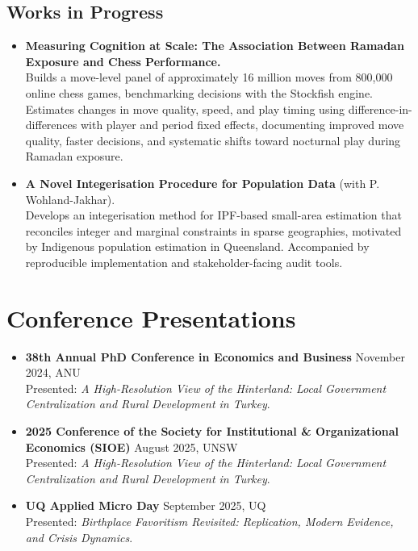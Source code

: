 \documentclass[11pt,a4paper]{article}
\begin{document}
\subsection*{Works in Progress}

\begin{itemize}
    \item \textbf{Measuring Cognition at Scale: The Association Between Ramadan Exposure and Chess Performance.} \\
    Builds a move-level panel of approximately 16 million moves from 800,000 online chess games, benchmarking decisions with the Stockfish engine. Estimates changes in move quality, speed, and play timing using difference-in-differences with player and period fixed effects, documenting improved move quality, faster decisions, and systematic shifts toward nocturnal play during Ramadan exposure.

    \item \textbf{A Novel Integerisation Procedure for Population Data} (with P. Wohland-Jakhar). \\
    Develops an integerisation method for IPF-based small-area estimation that reconciles integer and marginal constraints in sparse geographies, motivated by Indigenous population estimation in Queensland. Accompanied by reproducible implementation and stakeholder-facing audit tools.
\end{itemize}

\section{Conference Presentations}

\begin{itemize}
    \item \textbf{38th Annual PhD Conference in Economics and Business} \hfill November 2024, ANU \\
    Presented: \textit{A High-Resolution View of the Hinterland: Local Government Centralization and Rural Development in Turkey}.

    \item \textbf{2025 Conference of the Society for Institutional \& Organizational Economics (SIOE)} \hfill August 2025, UNSW \\
    Presented: \textit{A High-Resolution View of the Hinterland: Local Government Centralization and Rural Development in Turkey}.

    \item \textbf{UQ Applied Micro Day} \hfill September 2025, UQ \\
    Presented: \textit{Birthplace Favoritism Revisited: Replication, Modern Evidence, and Crisis Dynamics}.
\end{itemize}
\end{document}

